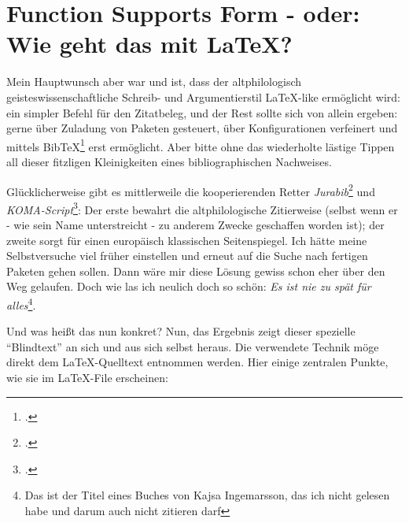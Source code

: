 %
%
%
%


\section{Function Supports Form - oder: Wie geht das mit LaTeX?}

Mein Hauptwunsch aber war und ist, dass der altphilologisch
geisteswissenschaftliche Schreib- und Argumentierstil LaTeX-like ermöglicht
wird: ein simpler Befehl für den Zitatbeleg, und der Rest sollte sich von allein
ergeben: gerne über Zuladung von Paketen gesteuert, über Konfigurationen
verfeinert und mittels BibTeX\footcite[vgl.][]{BibtexOrgDe} erst ermöglicht.
Aber bitte ohne das wiederholte lästige Tippen all dieser fitzligen
Kleinigkeiten eines bibliographischen Nachweises.

Glücklicherweise gibt es mittlerweile die kooperierenden Retter
\emph{Jurabib}\footcite[vgl.][]{Berger2004a} und
\emph{KOMA-Script}\footcite[vgl.][]{Kohm2008a}: Der erste bewahrt die
altphilologische Zitierweise (selbst wenn er - wie sein Name unterstreicht - zu
anderem Zwecke geschaffen worden ist); der zweite sorgt für einen europäisch
klassischen Seitenspiegel. Ich hätte meine Selbstversuche viel früher einstellen
und erneut auf die Suche nach fertigen Paketen gehen sollen. Dann wäre mir diese
Lösung gewiss schon eher über den Weg gelaufen. Doch wie las ich neulich doch so
schön: \emph{Es ist nie zu spät für alles}\footnote{Das ist der Titel eines
Buches von Kajsa Ingemarsson, das ich nicht gelesen habe und darum auch nicht
zitieren darf}.

Und was heißt das nun konkret? Nun, das Ergebnis zeigt dieser spezielle
"`Blindtext"' an sich und aus sich selbst heraus. Die verwendete Technik möge
direkt dem LaTeX-Quelltext entnommen werden. Hier einige zentralen Punkte, wie
sie im LaTeX-File erscheinen:

